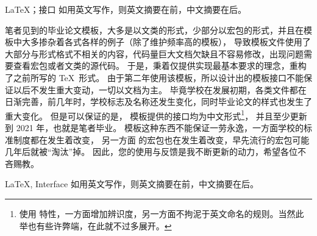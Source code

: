 \begin{中文摘要}{\LaTeX ；接口}
  如用英文写作，则英文摘要在前，中文摘要在后。

  笔者见到的毕业论文模板，大多是以文类的形式，少部分以宏包的形式，并且在模板中大多掺杂着各式各样的例子（除了维护频率高的模板），
  导致模板文件使用了大部分与形式格式不相关的内容，代码量巨大文档欠缺且不容易修改，出现问题需要查看宏包或者文类的源代码。
  于是，秉着仅提供实现最基本要求的理念，重构了之前所写的 \TeX\ 形式。
  由于第二年使用该模板，所以设计出的模板接口不能保证以后不发生重大变动，一切以文档为主。
  毕竟学校在发展初期，各类文件都在日渐完善，前几年时，学校标志及名称还发生变化，同时毕业论文的样式也发生了重大变化。
  但是可以保证的是，
  模板提供的接口均为中文形式\footnote{使用  特性，一方面增加辨识度，另一方面不拘泥于英文命名的规则。当然此举也有些许弊端，在此就不过多展开。}，
  并且至少更新到 2021 年，也就是笔者毕业。
  模板这种东西不能保证一劳永逸，一方面学校的标准制度都在发生着改变，
  另一方面  的宏包也在发生着改变，早先流行的宏包可能几年后就被“淘汰”掉。
  因此，您的使用与反馈是我不断更新的动力，希望各位不吝赐教。
\end{中文摘要}

\begin{英文摘要}{LaTeX, Interface}
  如用英文写作，则英文摘要在前，中文摘要在后。

  \lipsum[1]
\end{英文摘要}
\cleardoublepage
